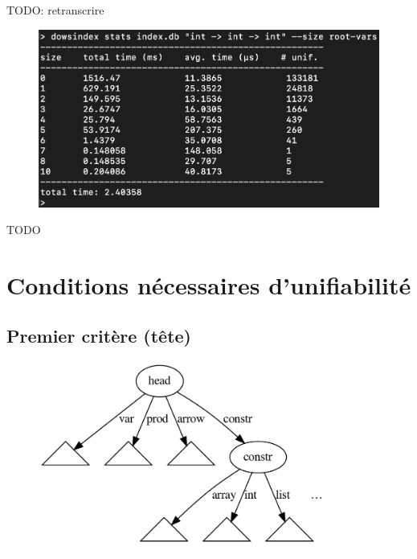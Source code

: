 \documentclass [a4paper] {report}
\theoremstyle {definition}
\begin{document}
TODO: retranscrire
\begin {figure} [h]
\begin {center}
	\includegraphics [scale=0.2] {images/stats3}
\end {center}
\end {figure}

TODO

\section {Conditions nécessaires d'unifiabilité}

\subsection {Premier critère (tête)}


\begin {figure} [h]
\begin {center}
	\includegraphics [scale=0.2] {graphs/by_head}
\end {center}
\end {figure}
\end{document}
